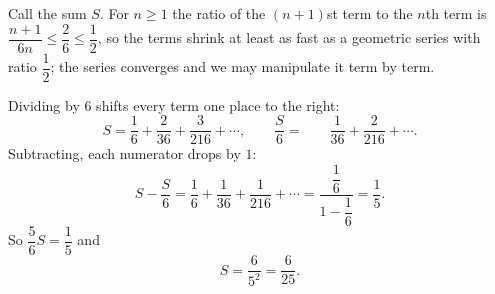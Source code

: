 Call the sum $S$. For $n\ge1$ the ratio of the $(n+1)$st term to the $n$th term is $\dfrac{n+1}{6n}\le\dfrac{2}{6}\le\dfrac{1}{2}$, so the terms shrink at least as fast as a geometric series with ratio $\dfrac{1}{2}$; the series converges and we may manipulate it term by term.

Dividing by $6$ shifts every term one place to the right:
\[S=\dfrac{1}{6}+\dfrac{2}{36}+\dfrac{3}{216}+\cdots,\qquad \dfrac{S}{6}=\phantom{\dfrac{1}{6}+{}}\dfrac{1}{36}+\dfrac{2}{216}+\cdots.\]
Subtracting, each numerator drops by $1$:
\[S-\dfrac{S}{6}=\dfrac{1}{6}+\dfrac{1}{36}+\dfrac{1}{216}+\cdots=\dfrac{\dfrac{1}{6}}{1-\dfrac{1}{6}}=\dfrac{1}{5}.\]
So $\dfrac{5}{6}S=\dfrac{1}{5}$ and
\[S=\dfrac{6}{5^2}=\boxed{\dfrac{6}{25}}.\]

